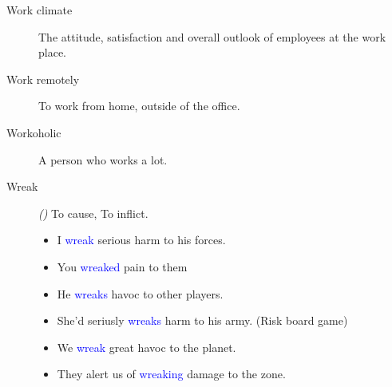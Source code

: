 \begin{multicols}{2}
\begin{description}
\item[Work climate] The attitude, satisfaction and overall outlook of employees at the work place.

\item[Work remotely]To work from home, outside of the office.

\item[Workoholic] A person who works a lot.

\item[Wreak] \emph{()} To cause, To inflict.
\begin{itemize}
\item I \textcolor{blue}{wreak} serious harm to his forces.
\item You \textcolor{blue}{wreaked} pain to them
\item He \textcolor{blue}{wreaks} havoc to other players.
\item She'd seriusly \textcolor{blue}{wreaks} harm to his army. (Risk board game)
\item We \textcolor{blue}{wreak} great havoc to the planet.
\item They alert us of \textcolor{blue}{wreaking} damage to the zone.
\end{itemize}
\end{description}
\end{multicols}
